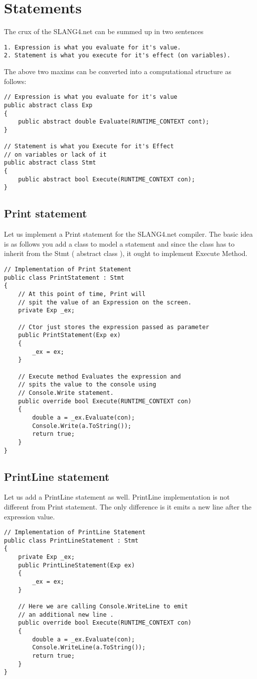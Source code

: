 \chapter{Statements}
The crux of the SLANG4.net can be summed up in two sentences
\begin{verbatim}
1. Expression is what you evaluate for it's value.
2. Statement is what you execute for it's effect (on variables).
\end{verbatim}
The above two maxims can be converted into a computational structure as follows:
\lstset{style=csharp}
\begin{lstlisting}
// Expression is what you evaluate for it's value
public abstract class Exp
{
	public abstract double Evaluate(RUNTIME_CONTEXT cont);
}

// Statement is what you Execute for it's Effect
// on variables or lack of it
public abstract class Stmt
{
	public abstract bool Execute(RUNTIME_CONTEXT con);
}
\end{lstlisting}

\section{Print statement}
Let us implement a Print statement for the SLANG4.net compiler. The basic idea is as follows you add a class to model a statement and since the class has to inherit from the Stmt ( abstract class ), it ought to implement Execute Method.
\lstset{style=csharp}
\begin{lstlisting}
// Implementation of Print Statement
public class PrintStatement : Stmt
{
	// At this point of time, Print will
	// spit the value of an Expression on the screen.
	private Exp _ex;
	
	// Ctor just stores the expression passed as parameter
	public PrintStatement(Exp ex)
	{
		_ex = ex;
	}

	// Execute method Evaluates the expression and
	// spits the value to the console using
	// Console.Write statement.
	public override bool Execute(RUNTIME_CONTEXT con)
	{
		double a = _ex.Evaluate(con);
		Console.Write(a.ToString());
		return true;
	}
}
\end{lstlisting}
\section{PrintLine statement}
Let us add a PrintLine statement as well. PrintLine implementation is not different from Print statement. The only difference is it emits a new line after the expression value.
\lstset{style=csharp}
\begin{lstlisting}
// Implementation of PrintLine Statement
public class PrintLineStatement : Stmt
{
	private Exp _ex;
	public PrintLineStatement(Exp ex)
	{
		_ex = ex;
	}
	
	// Here we are calling Console.WriteLine to emit
	// an additional new line .
	public override bool Execute(RUNTIME_CONTEXT con)
	{
		double a = _ex.Evaluate(con);
		Console.WriteLine(a.ToString());
		return true;
	}
}
\end{lstlisting}

